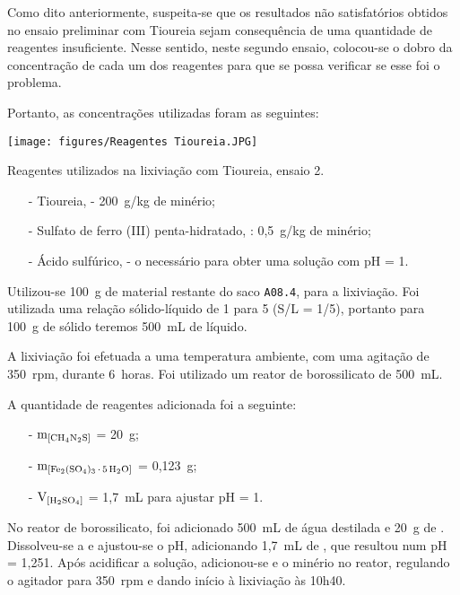 Como dito anteriormente, suspeita-se que os resultados não satisfatórios obtidos no ensaio preliminar com Tioureia sejam consequência de uma quantidade de reagentes insuficiente.
Nesse sentido, neste segundo ensaio, colocou-se o dobro da concentração de cada um dos reagentes para que se possa verificar se esse foi o problema.

Portanto, as concentrações utilizadas foram as seguintes:

\begin{marginfigure}[2.5cm]
	\centering
	\texttt{[image: figures/Reagentes Tioureia.JPG]}
	\caption{Reagentes utilizados na lixiviação com Tioureia, ensaio 2.}
	\label{fig:reagentes-tioureia2}
\end{marginfigure}

\begin{itemize}
	\item[-] Tioureia, \tioureia{} - 200~g/kg de minério;
	\item[-] Sulfato de ferro (III) penta-hidratado, \sulfe{}: 0,5~g/kg de minério;
	\item[-] Ácido sulfúrico, \acsul{} - o necessário para obter uma solução com pH = 1.
\end{itemize}

Utilizou-se 100~g de material restante do saco \texttt{A08.4}, para a lixiviação.
Foi utilizada uma relação sólido-líquido de 1 para 5 (S/L = 1/5), portanto para 100~g de sólido teremos 500~mL de líquido.

A lixiviação foi efetuada a uma temperatura ambiente, com uma agitação de 350~rpm, durante 6~horas.
Foi utilizado um reator de borossilicato de 500~mL.


A quantidade de reagentes adicionada foi a seguinte:
\begin{itemize}
	\item[-] $\mathrm{m}_{\left[\tioureia{}\right]}$ = 20~g;
	\item[-] $\mathrm{m}_{\left[\sulfe{}\right]}$ = 0,123~g;
	\item[-] $\mathrm{V}_{\left[\acsul{}\right]}$ = 1,7~mL para ajustar pH = 1.
\end{itemize}

No reator de borossilicato, foi adicionado 500~mL de água destilada e 20~g de \tioureia{}. 
Dissolveu-se a \tioureia{} e ajustou-se o pH, adicionando 1,7~mL de \acsul{}, que resultou num pH = 1,251.
Após acidificar a solução, adicionou-se \sulfe{} e o minério no reator, regulando o agitador para 350~rpm e dando início à lixiviação às 10h40.

